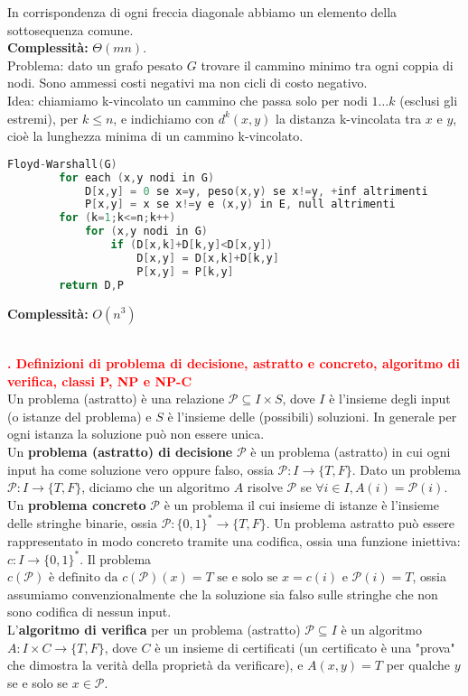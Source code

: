 \documentclass[12pt]{article}
\newcounter{questioncounter}
\newcommand{\question}[1]{
    \stepcounter{questioncounter}
    \textbf{\\\textcolor{red}{\arabic{questioncounter}. #1}}\\
}
\begin{document}
In corrispondenza di ogni freccia diagonale abbiamo un elemento della sottosequenza comune.\\
\textbf{Complessità:} $\Theta(mn)$.\\
Problema: dato un grafo pesato $G$ trovare il cammino minimo tra ogni coppia di nodi. Sono ammessi costi negativi ma non cicli di costo negativo.\\
Idea: chiamiamo k-vincolato un cammino che passa solo per nodi $1\ldots k$ (esclusi gli estremi), per $k\leq n$, e indichiamo con $d^{k}(x,y)$ la distanza k-vincolata tra $x$ e $y$, cioè la lunghezza minima di un cammino k-vincolato.
\begin{lstlisting}[language=C]
    Floyd-Warshall(G)
        for each (x,y nodi in G)
            D[x,y] = 0 se x=y, peso(x,y) se x!=y, +inf altrimenti
            P[x,y] = x se x!=y e (x,y) in E, null altrimenti
        for (k=1;k<=n;k++)
            for (x,y nodi in G)
                if (D[x,k]+D[k,y]<D[x,y])
                    D[x,y] = D[x,k]+D[k,y]
                    P[x,y] = P[k,y]
        return D,P
\end{lstlisting}
\textbf{Complessità:} $O(n^{3})$
\question{Definizioni di problema di decisione, astratto e concreto, algoritmo di verifica, classi P, NP e NP-C}
Un problema (astratto) è una relazione $\mathcal{P}\subseteq I\times S$, dove $I$ è l'insieme degli input (o istanze del problema) e $S$ è l'insieme delle (possibili) soluzioni. In generale per ogni istanza la soluzione può non essere unica.\\
Un \textbf{problema (astratto) di decisione} $\mathcal{P}$ è un problema (astratto) in cui ogni input ha come soluzione vero oppure falso, ossia $\mathcal{P}:I\rightarrow \{T,F\}$. Dato un problema $\mathcal{P}:I\rightarrow \{T,F\}$, diciamo che un algoritmo $A$ risolve $\mathcal{P}$ se $\forall i\in I, A(i)=\mathcal{P}(i)$.\\
Un \textbf{problema concreto} $\mathcal{P}$ è un problema il cui insieme di istanze è l'insieme delle stringhe binarie, ossia $\mathcal{P}:\{0,1\}^{*}\rightarrow \{T,F\}$. Un problema astratto può essere rappresentato in modo concreto tramite una codifica, ossia una funzione iniettiva: $c:I\rightarrow \{0,1\}^{*}$. Il problema $c(\mathcal{P}) \text{ è definito da } c(\mathcal{P})(x)=T \text{ se e solo se } x=c(i) \text{ e } \mathcal{P}(i)=T$, ossia assumiamo convenzionalmente che la soluzione sia falso sulle stringhe che non sono codifica di nessun input.\\
L'\textbf{algoritmo di verifica} per un problema (astratto) $\mathcal{P}\subseteq I$ è un algoritmo $A:I\times C\rightarrow\{T,F\}$, dove $C$ è un insieme di certificati (un certificato è una "prova" che dimostra la verità della proprietà da verificare), e $A(x,y)=T$ per qualche $y$ se e solo se $x\in \mathcal{P}$.\\
\end{document}

